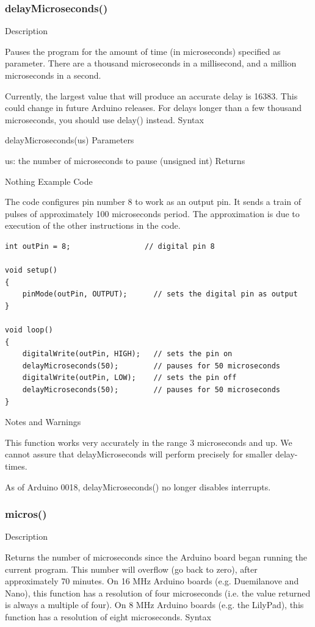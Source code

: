 \documentclass[12pt,a4paper]{report}  %
\begin{document}
\subsubsection{delayMicroseconds()}\label{delayMicroseconds}

Description

Pauses the program for the amount of time (in microseconds) specified as parameter. There are a thousand microseconds in a millisecond, and a million microseconds in a second.

Currently, the largest value that will produce an accurate delay is 16383. This could change in future Arduino releases. For delays longer than a few thousand microseconds, you should use delay() instead.
Syntax

delayMicroseconds(us)
Parameters

us: the number of microseconds to pause (unsigned int)
Returns

Nothing
Example Code

The code configures pin number 8 to work as an output pin. It sends a train of pulses of approximately 100 microseconds period. The approximation is due to execution of the other instructions in the code.

\begin{lstlisting}[label=digitalwrite,caption=delayMicroseconds]
int outPin = 8;                 // digital pin 8

void setup()
{
	pinMode(outPin, OUTPUT);      // sets the digital pin as output
}

void loop()
{
	digitalWrite(outPin, HIGH);   // sets the pin on
	delayMicroseconds(50);        // pauses for 50 microseconds
	digitalWrite(outPin, LOW);    // sets the pin off
	delayMicroseconds(50);        // pauses for 50 microseconds
}
\end{lstlisting}

Notes and Warnings

This function works very accurately in the range 3 microseconds and up. We cannot assure that delayMicroseconds will perform precisely for smaller delay-times.

As of Arduino 0018, delayMicroseconds() no longer disables interrupts.

\subsubsection{micros()}\label{micros}


Description

Returns the number of microseconds since the Arduino board began running the current program. This number will overflow (go back to zero), after approximately 70 minutes. On 16 MHz Arduino boards (e.g. Duemilanove and Nano), this function has a resolution of four microseconds (i.e. the value returned is always a multiple of four). On 8 MHz Arduino boards (e.g. the LilyPad), this function has a resolution of eight microseconds.
Syntax
\end{document}
